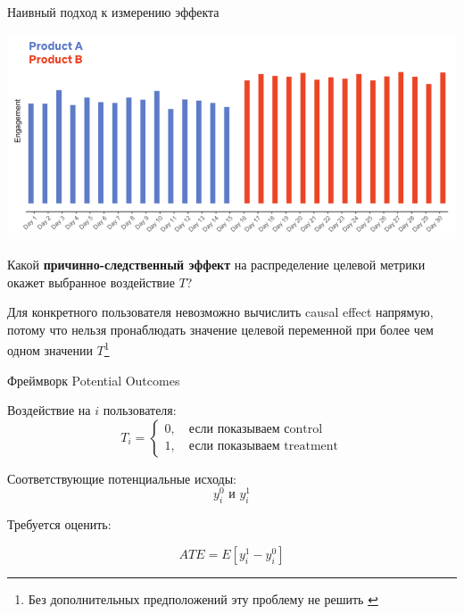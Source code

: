 \documentclass[11pt,aspectratio=169]{beamer}
\begin{document}
\begin{frame}{Наивный подход к измерению эффекта}
\begin{center}
\includegraphics[scale=0.3]{images/noexp.png}
\end{center}
\end{frame}

\begin{frame}{}

\begin{tcolorbox}[colback=info!5,colframe=info!80,title=Задача]
Какой {\bf причинно-следственный эффект} на распределение целевой метрики окажет выбранное воздействие $T$?
\end{tcolorbox}

\vfill

\begin{tcolorbox}[colback=warn!5,colframe=warn!80,title=Фундаментальная Проблема Causal Inference]
Для конкретного пользователя невозможно вычислить causal effect напрямую, потому что нельзя пронаблюдать значение целевой переменной при более чем одном значении $T$\footnote{Без дополнительных предположений эту проблему не решить \cite{GELMAN}}
\end{tcolorbox}

\end{frame}

\begin{frame}{Фреймворк Potential Outcomes}

Воздействие на $i$ пользователя:
\[
T_i = \begin{cases}
0, \quad \text{если показываем сontrol} \\
1, \quad \text{если показываем treatment}
\end{cases}
\]

Соответствующие потенциальные исходы:
\[
y_i^0 \text{ и } y_i^1
\]

Требуется оценить:
\begin{tcolorbox}[colback=info!5,colframe=info!80,title=Average Treatment Effect,center,width=6cm,center title]
\[
ATE = E \left[ y_i^1 - y_i^0 \right]
\]
\end{tcolorbox}

\end{frame}
\end{document}
